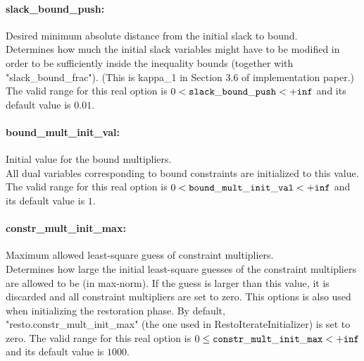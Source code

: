 \paragraph{slack\_bound\_push:}\label{sec:slack_bound_push} Desired minimum absolute distance from the initial slack to bound. $\;$ \\
 Determines how much the initial slack variables
might have to be modified in order to be
sufficiently inside the inequality bounds
(together with "slack\_bound\_frac").  (This is
kappa\_1 in Section 3.6 of implementation paper.) The valid range for this real option is 
$0 <  {\tt slack\_bound\_push } <  {\tt +inf}$
and its default value is $0.01$.


\paragraph{bound\_mult\_init\_val:}\label{sec:bound_mult_init_val} Initial value for the bound multipliers. $\;$ \\
 All dual variables corresponding to bound
constraints are initialized to this value. The valid range for this real option is 
$0 <  {\tt bound\_mult\_init\_val } <  {\tt +inf}$
and its default value is $1$.


\paragraph{constr\_mult\_init\_max:}\label{sec:constr_mult_init_max} Maximum allowed least-square guess of constraint multipliers. $\;$ \\
 Determines how large the initial least-square
guesses of the constraint multipliers are allowed
to be (in max-norm). If the guess is larger than
this value, it is discarded and all constraint
multipliers are set to zero.  This options is
also used when initializing the restoration
phase. By default,
"resto.constr\_mult\_init\_max" (the one used in
RestoIterateInitializer) is set to zero. The valid range for this real option is 
$0 \le {\tt constr\_mult\_init\_max } <  {\tt +inf}$
and its default value is $1000$.


